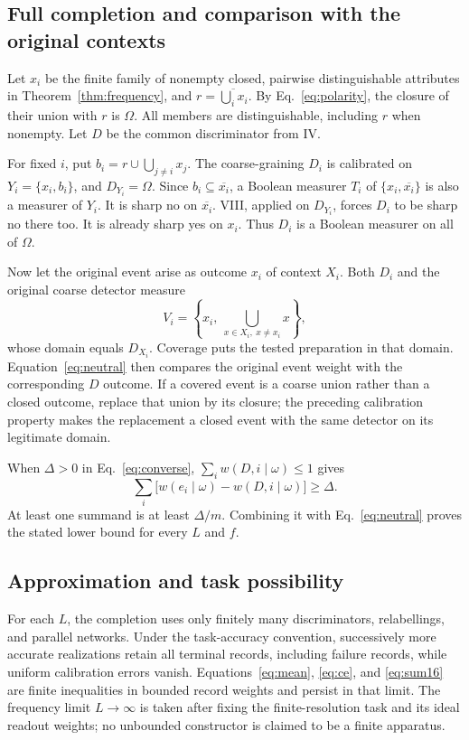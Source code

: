 \subsection{Full completion and comparison with the original contexts}
Let $x_i$ be the finite family of nonempty closed, pairwise distinguishable attributes in Theorem~\ref{thm:frequency}, and $r=\overline{\bigcup_i x_i}$. By Eq.~\eqref{eq:polarity}, the closure of their union with $r$ is $\Omega$. All members are distinguishable, including $r$ when nonempty. Let $D$ be the common discriminator from IV.

For fixed $i$, put $b_i=r\cup\bigcup_{j\ne i}x_j$. The coarse-graining $D_i$ is calibrated on $Y_i=\{x_i,b_i\}$, and $D_{Y_i}=\Omega$. Since $b_i\subseteq\overline{x_i}$, a Boolean measurer $T_i$ of $\{x_i,\overline{x_i}\}$ is also a measurer of $Y_i$. It is sharp no on $\overline{x_i}$. VIII, applied on $D_{Y_i}$, forces $D_i$ to be sharp no there too. It is already sharp yes on $x_i$. Thus $D_i$ is a Boolean measurer on all of $\Omega$.

Now let the original event arise as outcome $x_i$ of context $X_i$. Both $D_i$ and the original coarse detector measure
\begin{equation}\label{eq:comparison-variable}
 V_i=\left\{x_i,\ \bigcup_{x\in X_i,\ x\ne x_i}x\right\},
\end{equation}
whose domain equals $D_{X_i}$. Coverage puts the tested preparation in that domain. Equation~\eqref{eq:neutral} then compares the original event weight with the corresponding $D$ outcome. If a covered event is a coarse union rather than a closed outcome, replace that union by its closure; the preceding calibration property makes the replacement a closed event with the same detector on its legitimate domain.

When $\Delta>0$ in Eq.~\eqref{eq:converse}, $\sum_i w(D,i\mid\omega)\leq1$ gives
\begin{equation}\label{eq:excess-sum}
 \sum_i\bigl[w(e_i\mid\omega)-w(D,i\mid\omega)\bigr]\geq\Delta.
\end{equation}
At least one summand is at least $\Delta/m$. Combining it with Eq.~\eqref{eq:neutral} proves the stated lower bound for every $L$ and $f$.

\subsection{Approximation and task possibility}
For each $L$, the completion uses only finitely many discriminators, relabellings, and parallel networks. Under the task-accuracy convention, successively more accurate realizations retain all terminal records, including failure records, while uniform calibration errors vanish. Equations~\eqref{eq:mean}, \eqref{eq:ce}, and \eqref{eq:sum16} are finite inequalities in bounded record weights and persist in that limit. The frequency limit $L\to\infty$ is taken after fixing the finite-resolution task and its ideal readout weights; no unbounded constructor is claimed to be a finite apparatus.

